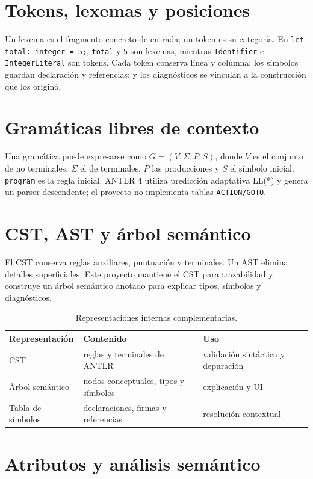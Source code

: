 \documentclass[11pt,letterpaper,oneside]{report}
\newcommand{\codigo}[1]{\texttt{#1}}
\begin{document}
\section{Tokens, lexemas y posiciones}

Un lexema es el fragmento concreto de entrada; un token es su categoría. En
\codigo{let total: integer = 5;}, \codigo{total} y \codigo{5} son lexemas, mientras
\codigo{Identifier} e \codigo{IntegerLiteral} son tokens. Cada token conserva línea y
columna; los símbolos guardan declaración y referencias; y los diagnósticos se
vinculan a la construcción que los originó.

\section{Gramáticas libres de contexto}

Una gramática puede expresarse como \(G=(V,\Sigma,P,S)\), donde \(V\) es el conjunto
de no terminales, \(\Sigma\) el de terminales, \(P\) las producciones y \(S\) el
símbolo inicial. \codigo{program} es la regla inicial. ANTLR 4 utiliza predicción
adaptativa LL(*) y genera un parser descendente; el proyecto no implementa tablas
\codigo{ACTION/GOTO}.

\section{CST, AST y árbol semántico}

El CST conserva reglas auxiliares, puntuación y terminales. Un AST elimina detalles
superficiales. Este proyecto mantiene el CST para trazabilidad y construye un árbol
semántico anotado para explicar tipos, símbolos y diagnósticos.

\begin{table}[H]
\centering
\begin{tabularx}{\textwidth}{lYY}
\toprule
Representación & Contenido & Uso \\
\midrule
CST & reglas y terminales de ANTLR & validación sintáctica y depuración \\
Árbol semántico & nodos conceptuales, tipos y símbolos & explicación y UI \\
Tabla de símbolos & declaraciones, firmas y referencias & resolución contextual \\
\bottomrule
\end{tabularx}
\caption{Representaciones internas complementarias.}
\end{table}

\section{Atributos y análisis semántico}
\end{document}
